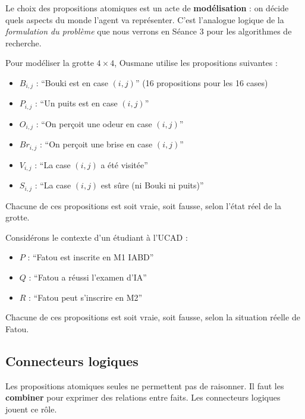 \documentclass[11pt,a4paper]{article}
\begin{document}
Le choix des propositions atomiques est un acte de \textbf{modélisation} : on décide quels aspects du monde l'agent va représenter. C'est l'analogue logique de la \textit{formulation du problème} que nous verrons en Séance 3 pour les algorithmes de recherche.

\begin{exemplebox}
Pour modéliser la grotte $4 \times 4$, Ousmane utilise les propositions suivantes :
\begin{itemize}[nosep]
    \item $B_{i,j}$ : ``Bouki est en case $(i,j)$'' \quad (16 propositions pour les 16 cases)
    \item $P_{i,j}$ : ``Un puits est en case $(i,j)$''
    \item $O_{i,j}$ : ``On perçoit une odeur en case $(i,j)$''
    \item $Br_{i,j}$ : ``On perçoit une brise en case $(i,j)$''
    \item $V_{i,j}$ : ``La case $(i,j)$ a été visitée''
    \item $S_{i,j}$ : ``La case $(i,j)$ est sûre (ni Bouki ni puits)''
\end{itemize}
Chacune de ces propositions est soit vraie, soit fausse, selon l'état réel de la grotte.
\end{exemplebox}

\begin{exemplebox}
Considérons le contexte d'un étudiant à l'UCAD :
\begin{itemize}[nosep]
    \item $P$ : ``Fatou est inscrite en M1 IABD''
    \item $Q$ : ``Fatou a réussi l'examen d'IA''
    \item $R$ : ``Fatou peut s'inscrire en M2''
\end{itemize}
Chacune de ces propositions est soit vraie, soit fausse, selon la situation réelle de Fatou.
\end{exemplebox}

\subsection{Connecteurs logiques}

Les propositions atomiques seules ne permettent pas de raisonner. Il faut les \textbf{combiner} pour exprimer des relations entre faits. Les connecteurs logiques jouent ce rôle.
\end{document}
